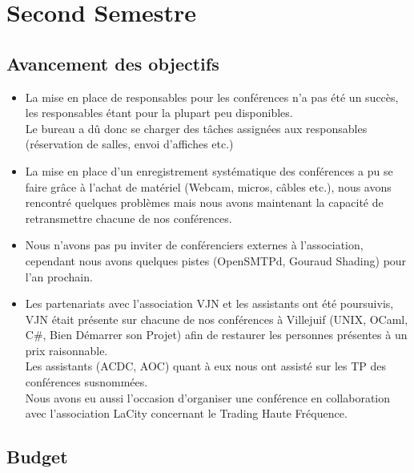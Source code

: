 \documentclass[12pt]{report}
\begin{document}
  \chapter{Second Semestre}
  \section{Avancement des objectifs}
  \begin{itemize}
          \item La mise en place de responsables pour les conférences n'a pas
                  été un succès, les responsables étant pour la plupart peu
                  disponibles.\\
                  Le bureau a dû donc se charger des tâches assignées aux
                  responsables (réservation de salles, envoi d'affiches etc.)
          \item La mise en place d'un enregistrement systématique des
                  conférences a pu se faire grâce à l'achat de matériel
                  (Webcam, micros, câbles etc.), nous avons rencontré quelques
                  problèmes mais nous avons maintenant la capacité de
                  retransmettre chacune de nos conférences.\\
          \item Nous n'avons pas pu inviter de conférenciers externes à
                  l'association, cependant nous avons quelques pistes
                  (OpenSMTPd, Gouraud Shading) pour l'an prochain.\\
          \item Les partenariats avec l'association VJN et les assistants ont
                  été poursuivis, VJN était présente sur chacune de nos
                  conférences à Villejuif (UNIX, OCaml, C\#, Bien Démarrer son
                  Projet) afin de restaurer les personnes présentes à un prix
                  raisonnable.\\
                  Les assistants (ACDC, AOC) quant à eux nous ont assisté sur
                  les TP des conférences susnommées.\\
                  Nous avons eu aussi l'occasion d'organiser une conférence en
                  collaboration avec l'association LaCity concernant le Trading
                  Haute Fréquence.
  \end{itemize}
  \newpage
  \section{Budget}
\end{document}
